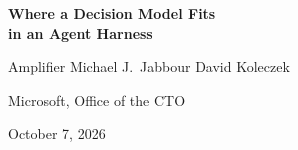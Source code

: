 \documentclass[11pt,letterpaper]{article}
\begin{document}
\thispagestyle{plain}
\begin{center}
  {\LARGE\sffamily\bfseries Where a Decision Model Fits\\[3pt] in an Agent Harness\par}
  \vspace{10pt}
  {\large Amplifier \qquad Michael J.\ Jabbour \qquad David Koleczek\par}
  \vspace{3pt}
  {\normalsize Microsoft, Office of the CTO\par}
  \vspace{3pt}
  {\normalsize October 7, 2026\par}
\end{center}
\vspace{4pt}












\end{document}
